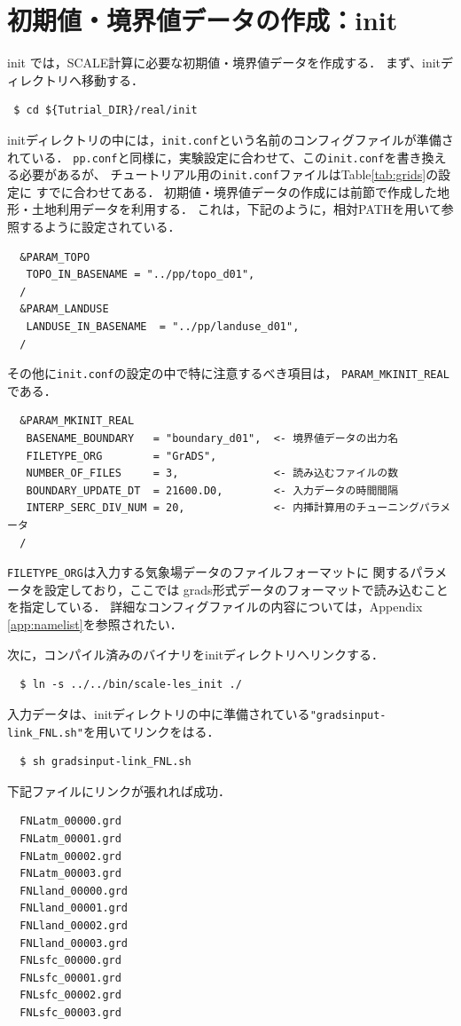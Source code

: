 
\section{初期値・境界値データの作成：init}

init では，SCALE計算に必要な初期値・境界値データを作成する．
まず、initディレクトリへ移動する．
\begin{verbatim}
 $ cd ${Tutrial_DIR}/real/init
\end{verbatim}

initディレクトリの中には，\verb|init.conf|という名前のコンフィグファイルが準備されている．
\verb|pp.conf|と同様に，実験設定に合わせて、この\verb|init.conf|を書き換える必要があるが、
チュートリアル用の\verb|init.conf|ファイルはTable\ref{tab:grids}の設定に
すでに合わせてある．
初期値・境界値データの作成には前節で作成した地形・土地利用データを利用する．
これは，下記のように，相対PATHを用いて参照するように設定されている．

\begin{verbatim}
  &PARAM_TOPO
   TOPO_IN_BASENAME = "../pp/topo_d01",
  /
  &PARAM_LANDUSE
   LANDUSE_IN_BASENAME  = "../pp/landuse_d01",
  /
\end{verbatim}
その他に\verb|init.conf|の設定の中で特に注意するべき項目は，
\verb|PARAM_MKINIT_REAL|である．

\begin{verbatim}
  &PARAM_MKINIT_REAL
   BASENAME_BOUNDARY   = "boundary_d01",  <- 境界値データの出力名
   FILETYPE_ORG        = "GrADS",
   NUMBER_OF_FILES     = 3,               <- 読み込むファイルの数
   BOUNDARY_UPDATE_DT  = 21600.D0,        <- 入力データの時間間隔
   INTERP_SERC_DIV_NUM = 20,              <- 内挿計算用のチューニングパラメータ
  /
\end{verbatim}

\verb|FILETYPE_ORG|は入力する気象場データのファイルフォーマットに
関するパラメータを設定しており，ここでは
grads形式データのフォーマットで読み込むことを指定している．
詳細なコンフィグファイルの内容については，Appendix \ref{app:namelist}を参照されたい．

次に，コンパイル済みのバイナリをinitディレクトリへリンクする．
\begin{verbatim}
  $ ln -s ../../bin/scale-les_init ./
\end{verbatim}
入力データは、initディレクトリの中に準備されている\verb|"gradsinput-link_FNL.sh"|を用いてリンクをはる．
\begin{verbatim}
  $ sh gradsinput-link_FNL.sh
\end{verbatim}
下記ファイルにリンクが張れれば成功．
{\small
\begin{verbatim}
  FNLatm_00000.grd
  FNLatm_00001.grd
  FNLatm_00002.grd
  FNLatm_00003.grd
  FNLland_00000.grd
  FNLland_00001.grd
  FNLland_00002.grd
  FNLland_00003.grd
  FNLsfc_00000.grd
  FNLsfc_00001.grd
  FNLsfc_00002.grd
  FNLsfc_00003.grd
\end{verbatim} }

